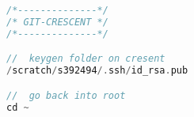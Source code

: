 \documentclass[8pt]{extarticle}
\begin{document}
\begin{small}
\begin{multicols}{2}
\begin{lstlisting}[language=C]
/*--------------*/
/* GIT-CRESCENT */
/*--------------*/

//  keygen folder on cresent
/scratch/s392494/.ssh/id_rsa.pub

//  go back into root
cd ~


\end{lstlisting}

\vfill\null
\columnbreak
\vfill\null

\end{multicols}
\end{small}
\end{document}
